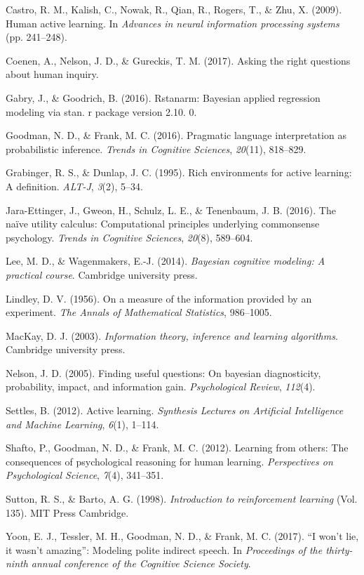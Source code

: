 \documentclass[10pt, letterpaper]{article}
\begin{document}
\setlength{\parindent}{-0.1in} \setlength{\leftskip}{0.125in} \noindent

\hypertarget{refs}{}
\hypertarget{ref-castro2009human}{}
Castro, R. M., Kalish, C., Nowak, R., Qian, R., Rogers, T., \& Zhu, X.
(2009). Human active learning. In \emph{Advances in neural information
processing systems} (pp. 241--248).

\hypertarget{ref-coenen2017}{}
Coenen, A., Nelson, J. D., \& Gureckis, T. M. (2017). Asking the right
questions about human inquiry.

\hypertarget{ref-gabry2016rstanarm}{}
Gabry, J., \& Goodrich, B. (2016). Rstanarm: Bayesian applied regression
modeling via stan. r package version 2.10. 0.

\hypertarget{ref-goodman2016}{}
Goodman, N. D., \& Frank, M. C. (2016). Pragmatic language
interpretation as probabilistic inference. \emph{Trends in Cognitive
Sciences}, \emph{20}(11), 818--829.

\hypertarget{ref-grabinger1995rich}{}
Grabinger, R. S., \& Dunlap, J. C. (1995). Rich environments for active
learning: A definition. \emph{ALT-J}, \emph{3}(2), 5--34.

\hypertarget{ref-jara2016}{}
Jara-Ettinger, J., Gweon, H., Schulz, L. E., \& Tenenbaum, J. B. (2016).
The naïve utility calculus: Computational principles underlying
commonsense psychology. \emph{Trends in Cognitive Sciences},
\emph{20}(8), 589--604.

\hypertarget{ref-lee2014bayesian}{}
Lee, M. D., \& Wagenmakers, E.-J. (2014). \emph{Bayesian cognitive
modeling: A practical course}. Cambridge university press.

\hypertarget{ref-lindley1956}{}
Lindley, D. V. (1956). On a measure of the information provided by an
experiment. \emph{The Annals of Mathematical Statistics}, 986--1005.

\hypertarget{ref-mackay2003}{}
MacKay, D. J. (2003). \emph{Information theory, inference and learning
algorithms}. Cambridge university press.

\hypertarget{ref-nelson2005}{}
Nelson, J. D. (2005). Finding useful questions: On bayesian
diagnosticity, probability, impact, and information gain.
\emph{Psychological Review}, \emph{112}(4).

\hypertarget{ref-settles2012active}{}
Settles, B. (2012). Active learning. \emph{Synthesis Lectures on
Artificial Intelligence and Machine Learning}, \emph{6}(1), 1--114.

\hypertarget{ref-shafto2012learning}{}
Shafto, P., Goodman, N. D., \& Frank, M. C. (2012). Learning from
others: The consequences of psychological reasoning for human learning.
\emph{Perspectives on Psychological Science}, \emph{7}(4), 341--351.

\hypertarget{ref-sutton1998}{}
Sutton, R. S., \& Barto, A. G. (1998). \emph{Introduction to
reinforcement learning} (Vol. 135). MIT Press Cambridge.

\hypertarget{ref-yoon2017}{}
Yoon, E. J., Tessler, M. H., Goodman, N. D., \& Frank, M. C. (2017). ``I
won't lie, it wasn't amazing'': Modeling polite indirect speech. In
\emph{Proceedings of the thirty-ninth annual conference of the Cognitive
Science Society}.
\end{document}
